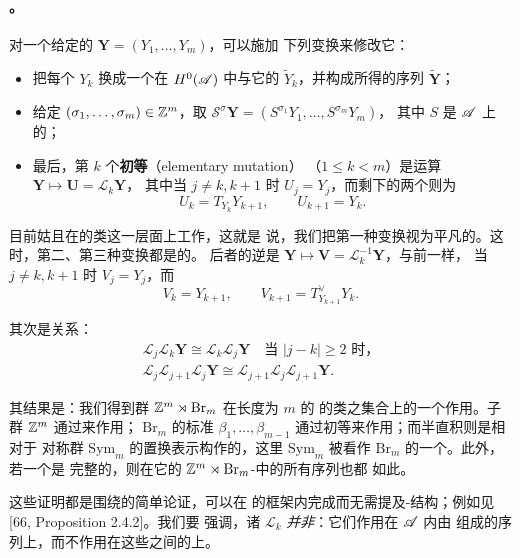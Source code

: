 \paragraph{\trMutation{}。}\label{sub:mutation}
对一个给定的\trExceptionalCollection{} $\mathbf{Y}=(Y_1,\ldots,Y_m)$，可以施加
下列变换来修改它：
\begin{itemize}
\item 把每个 $Y_k$ 换成一个在 $H^0(\mathscr{A})$ 中与它\trIsomorphic{}的%
\trObject{} $\tilde{Y}_k$，并构成所得的序列 $\widetilde{\mathbf{Y}}$；
\item 给定 $(\sigma_1,\ldots,\sigma_m)\in\mathbb{Z}^m$，取
$\mathscr{S}^{\sigma}\mathbf{Y}=(S^{\sigma_1}Y_1,\ldots,S^{\sigma_m}Y_m)$，
其中 $S$ 是 $\mathscr{A}$ 上的\trShiftFunctor；
\item 最后，第 $k$ 个\textbf{初等\trMutation}（elementary mutation）
（$1\le k<m$）是运算 $\mathbf{Y}\mapsto\mathbf{U}=\mathscr{L}_k\mathbf{Y}$，
其中当 $j\neq k,k+1$ 时 $U_j=Y_j$，而剩下的两个\trObject{}则为
\begin{equation}\label{eq:elementary-mutation}
U_k=T_{Y_k}Y_{k+1},\qquad U_{k+1}=Y_k.
\end{equation}
\end{itemize}

目前姑且在\trExceptionalCollection{}的\trIsomorphism{}类这一层面上工作，这就是
说，我们把第一种变换视为平凡的。这时，第二、第三种变换都是\trInvertible{}的。
后者的逆是 $\mathbf{Y}\mapsto\mathbf{V}=\mathscr{L}_k^{-1}\mathbf{Y}$，与前一样，
当 $j\neq k,k+1$ 时 $V_j=Y_j$，而
\begin{equation*}
V_k=Y_{k+1},\qquad V_{k+1}=T^{\vee}_{Y_{k+1}}Y_k.
\end{equation*}

其次是\trBraid{}关系：
\begin{equation*}
\begin{gathered}
\mathscr{L}_j\mathscr{L}_k\mathbf{Y}\cong\mathscr{L}_k\mathscr{L}_j\mathbf{Y}
\quad\text{当 }|j-k|\ge 2\text{ 时，}\\
\mathscr{L}_j\mathscr{L}_{j+1}\mathscr{L}_j\mathbf{Y}
\cong\mathscr{L}_{j+1}\mathscr{L}_j\mathscr{L}_{j+1}\mathbf{Y}.
\end{gathered}
\end{equation*}

其结果是：我们得到群 $\mathbb{Z}^m\rtimes\mathrm{Br}_m$ 在长度为 $m$ 的%
\trExceptionalCollection{}的\trIsomorphism{}类之集合上的一个作用。子群 $\mathbb{Z}^m$
通过\trSuspension{}来作用；\trBraidGroup{} $\mathrm{Br}_m$ 的标准\trGenerator{}%
$\beta_1,\ldots,\beta_{m-1}$ 通过初等\trMutation{}来作用；而半直积则是相对于
对称群 $\mathrm{Sym}_m$ 的置换表示构作的，这里 $\mathrm{Sym}_m$ 被看作
$\mathrm{Br}_m$ 的一个\trQuotient。此外，若一个\trExceptionalCollection{}是
完整的，则在它的 $\mathbb{Z}^m\rtimes\mathrm{Br}_m$-\trTrajectory{}中的所有序列也都
如此。

这些证明都是围绕\trExactTriangle{}的简单论证，可以在\trTriangulated{}\trCategory{}%
的框架内完成而无需提及\trAinfty-结构；例如见 [66, Proposition 2.4.2]。我们要
强调，诸 $\mathscr{L}_k$ \emph{并非}\trFunctor：它们作用在 $\mathscr{A}$ 内由%
\trObject{}组成的序列上，而不作用在这些\trObject{}之间的\trMorphism{}上。
